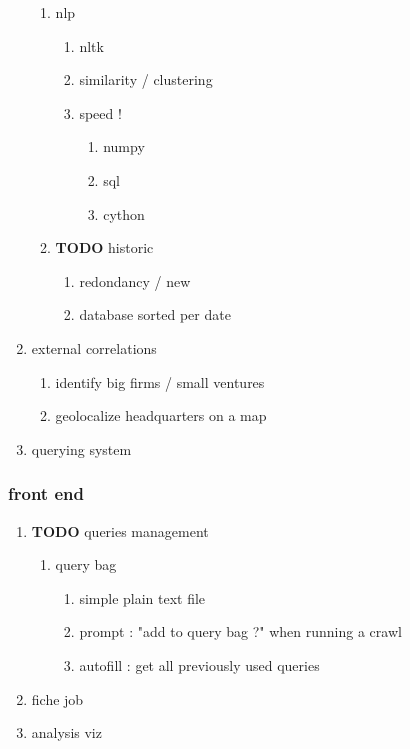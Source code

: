 \documentclass[11pt]{article}
\begin{document}
\begin{enumerate}
\begin{enumerate}
\item nlp
\label{sec:org5bce391}
\begin{enumerate}
\item nltk
\label{sec:org07b00c1}
\item similarity / clustering
\label{sec:orgeb5c654}
\item speed !
\label{sec:orgbe2adca}
\begin{enumerate}
\item numpy
\label{sec:orgf640be0}
\item sql
\label{sec:orgcbf396b}
\item cython
\label{sec:orgbb7bfc0}
\end{enumerate}
\end{enumerate}
\item {\bfseries\sffamily TODO} historic
\label{sec:orgf4de443}
\begin{enumerate}
\item redondancy / new
\label{sec:org42f8c90}
\item database sorted per date
\label{sec:org7b1aedb}
\end{enumerate}
\end{enumerate}
\item external correlations
\label{sec:orgb7d2a0a}
\begin{enumerate}
\item identify big firms / small ventures
\label{sec:org61b89a6}
\item geolocalize headquarters on a map
\label{sec:org157a280}
\end{enumerate}
\item querying system
\label{sec:orge6c308e}
\end{enumerate}
\subsubsection{front end}
\label{sec:orga320d7e}
\begin{enumerate}
\item {\bfseries\sffamily TODO} queries management
\label{sec:org9ba0c29}
\begin{enumerate}
\item query bag
\label{sec:orge374392}
\begin{enumerate}
\item simple plain text file
\label{sec:org48fedd9}
\item prompt : "add to query bag ?" when running a crawl
\label{sec:org1449382}
\item autofill : get all previously used queries
\label{sec:org17e0f77}
\end{enumerate}
\end{enumerate}
\item fiche job
\label{sec:org46e9d91}
\item analysis viz
\label{sec:orga5ea0b1}
\end{enumerate}
\end{document}
